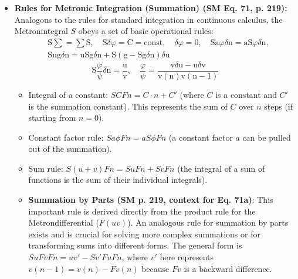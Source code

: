 \documentclass[12pt]{article}
\newcommand{\metrondifferential}{F} %
\newcommand{\metronintegral}{S} %
\newcommand{\metronenziffer}{n}
\begin{document}
\begin{itemize}
    \item \textbf{Rules for Metronic Integration (Summation) (SM Eq. 71, p. 219):}
    Analogous to the rules for standard integration in continuous calculus, the Metronintegral \( \metronintegral \) obeys a set of basic operational rules:
    \begin{equation}
    \begin{aligned}
    & \mathrm{S}\sum = \sum\mathrm{S}, \quad \mathrm{S}\delta\varphi = \mathrm{C} = \text{const}, \quad \delta\varphi = 0, \quad \mathrm{Sa}\varphi\delta\mathrm{n} = \mathrm{aS}\varphi\delta\mathrm{n}, \\
    & \mathrm{S}\mathrm{ug}\delta\mathrm{n} = \mathrm{u}\mathrm{S}\mathrm{g}\delta\mathrm{n} + \mathrm{S}(\mathrm{g} - \mathrm{Sg}\delta\mathrm{n})\delta\mathrm{u}
    \end{aligned} \tag{71}
    \end{equation}
    \begin{equation}
    \mathrm{S}\frac{\varphi}{\psi}\delta\mathrm{n} = \frac{\mathrm{u}}{\mathrm{v}}, \quad \frac{\varphi}{\psi} = \frac{\mathrm{v}\delta\mathrm{u} - \mathrm{u}\delta\mathrm{v}}{\mathrm{v}(\mathrm{n})\mathrm{v}(\mathrm{n}-1)} \tag{71a}
    \end{equation}
    \begin{itemize}
        \item Integral of a constant: \( \metronintegral C \metrondifferential\metronenziffer = C \cdot \metronenziffer + C' \) (where \( C \) is a constant and \( C' \) is the summation constant). This represents the sum of \( C \) over \( \metronenziffer \) steps (if starting from \(n=0\)).
        \item Constant factor rule: \( \metronintegral a\phi \metrondifferential\metronenziffer = a \metronintegral\phi \metrondifferential\metronenziffer \) (a constant factor \( a \) can be pulled out of the summation).
        \item Sum rule: \( \metronintegral(u+v)\metrondifferential\metronenziffer = \metronintegral u \metrondifferential\metronenziffer + \metronintegral v \metrondifferential\metronenziffer \) (the integral of a sum of functions is the sum of their individual integrals).
        \item \textbf{Summation by Parts (SM p. 219, context for Eq. 71a)}: This important rule is derived directly from the product rule for the Metrondifferential (\( \metrondifferential(uv) \)). An analogous rule for summation by parts exists and is crucial for solving more complex summations or for transforming sums into different forms. The general form is \( \metronintegral u \metrondifferential v \metrondifferential\metronenziffer = uv' - \metronintegral v' \metrondifferential u \metrondifferential\metronenziffer \), where \( v' \) here represents \( v(\metronenziffer-1) = v(\metronenziffer) - \metrondifferential v(\metronenziffer) \) because \( \metrondifferential v \) is a backward difference.
    \end{itemize}


\end{itemize}
\end{document}
